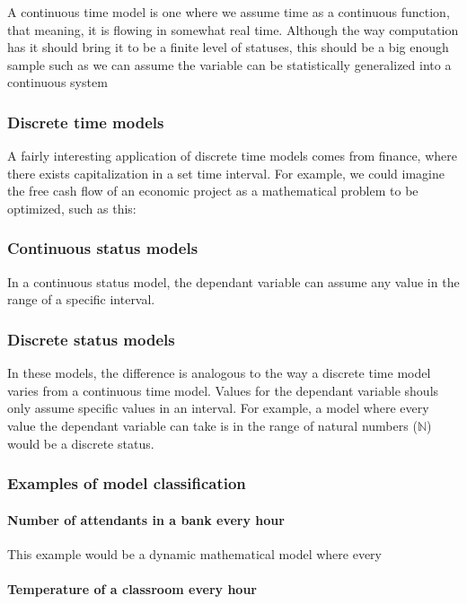 \documentclass{textbook}
\begin{document}
A continuous time model is one where we assume time as a continuous function, that meaning, it is
flowing in somewhat real time. Although the way computation has it should bring it to be a finite level of
statuses, this should be a big enough sample such as we can assume the variable can be statistically generalized into
a continuous system

\subsubsection{Discrete time models}

A fairly interesting application of discrete time models comes from finance, where there exists 
capitalization in a set time interval. For example, we could imagine the free cash flow of an economic project as
a mathematical problem to be optimized, such as this:

\subsubsection{Continuous status models}

In a continuous status model, the dependant variable can assume any value in the range of a specific interval.

\subsubsection{Discrete status models}

In these models, the difference is analogous to the way a discrete time model varies from a continuous
time model. Values for the dependant variable shouls only assume specific values in an interval. For example, a
model where every value the dependant variable can take is in the range of natural numbers ($\mathbb{N}$) would be 
a discrete status.

\subsubsection{Examples of model classification}

\paragraph{Number of attendants in a bank every hour}

This example would be a dynamic mathematical model where every 

\paragraph{Temperature of a classroom every hour}
\end{document}

